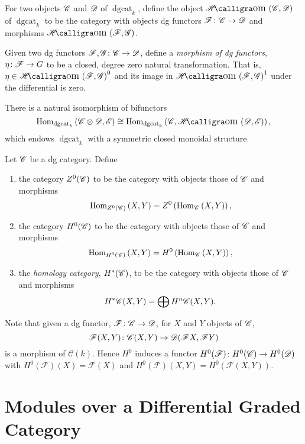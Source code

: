 \documentclass[dissertation.tex]{subfiles}
\begin{document}
\begin{defn}
  For two objects $\mathscr{C}$ and $\mathscr{D}$ of $\operatorname{dgcat}_k$, define the object $\SHom{\CC,\D}$ of $\operatorname{dgcat}_k$ to be the category with objects dg functors $\mathscr{F} \colon \mathscr{C} \rightarrow \mathscr{D}$ and morphisms $\SHom{\mathscr{F},\mathscr{G}}$.
  
  Given two dg functors $\mathscr{F},\mathscr{G} \colon \mathscr{C} \rightarrow \mathscr{D}$, define a {\it morphism of dg functors}, $\eta \colon \mathscr{F} \rightarrow G$ to be a closed, degree zero natural transformation.
  That is, $\eta \in \SHom{\F, \G}^0$ and its image in $\SHom{\F,\G}^1$ under the differential is zero.
\end{defn}

\begin{rmk}
  There is a natural isomorphism of bifunctors
  $$\Hom{\operatorname{dgcat}_k}{\CC \otimes \D, \mathscr{E}} \cong \Hom{\operatorname{dgcat}_k}{\CC, \SHom{\D,\mathscr{E}}},$$
  which endows $\operatorname{dgcat}_k$ with a symmetric closed monoidal structure.
\end{rmk}

\begin{defn}
  Let $\mathscr{C}$ be a dg category.
  Define
  \begin{enumerate}
  \item
    the category $Z^0(\mathscr{C})$ to be the category with objects those of $\mathscr{C}$ and morphisms
    $$\operatorname{Hom}_{Z^0(\mathscr{C})}\left(X,Y\right) = Z^0\left(\operatorname{Hom}_{\mathscr{C}}\left(X,Y\right)\right),$$
  \item
    the category $H^0(\mathscr{C})$ to be the category with objects those of $\mathscr{C}$ and morphisms
    $$\operatorname{Hom}_{H^0(\mathscr{C})}\left(X,Y\right) = H^0\left(\operatorname{Hom}_{\mathscr{C}}\left(X,Y\right)\right),$$
  \item
    the {\it homology category}, $H^\ast(\mathscr{C})$, to be the category with objects those of $\mathscr{C}$ and morphisms 
    $$H^\ast\mathscr{C}(X,Y) = \bigoplus H^n\mathscr{C}(X,Y).$$
  \end{enumerate}
\end{defn}

\begin{rmk}
  Note that given a dg functor, $\mathscr{F} \colon \mathscr{C} \rightarrow \mathscr{D}$, for $X$ and $Y$ objects of $\mathscr{C}$, 
  $$\mathscr{F}(X,Y) \colon \mathscr{C}(X,Y) \rightarrow \mathscr{D}(\mathscr{F}X, \mathscr{F}Y)$$
  is a morphism of $\mathcal{C}(k)$.
  Hence $H^0$ induces a functor
  $H^0(\mathscr{F}) \colon H^0(\mathscr{C}) \rightarrow H^0(\mathscr{D})$
  with $H^0(\mathscr{F})(X) = \mathscr{F}(X)$ and $H^0(\mathscr{F})(X,Y) = H^0(\mathscr{F}(X,Y))$.
\end{rmk}

\section{Modules over a Differential Graded Category}
\end{document}
